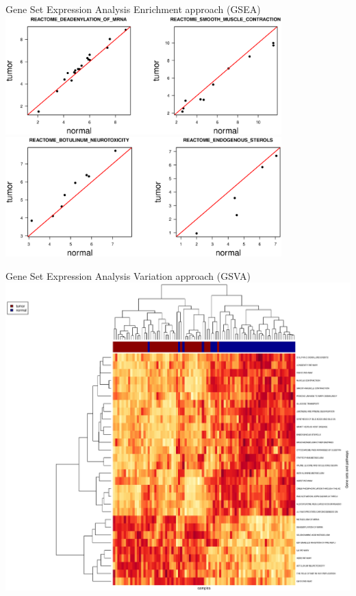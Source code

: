 \documentclass{beamer}
\begin{document}
\begin{frame}{Gene Set Expression Analysis}{ Enrichment approach (GSEA)}
\centering \includegraphics[width=0.8\textwidth,height=0.4\textheight,keepaspectratio]{genesets1.eps} \\
        \includegraphics[width=0.8\textwidth,height=0.4\textheight,keepaspectratio]{genesets2.eps}
\end{frame}

\begin{frame}{Gene Set Expression Analysis}{ Variation  approach (GSVA)}
   \centering
        \includegraphics[width=1\textwidth,height=0.8\textheight,keepaspectratio]{ClusteringGSVA.eps}

\end{frame}
\end{document}
